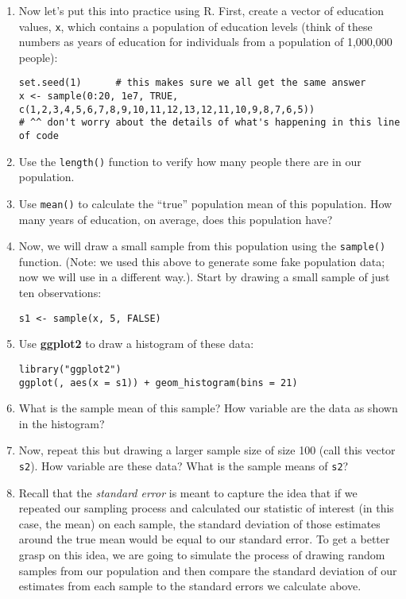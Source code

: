 \documentclass[a4paper,12pt]{article}
\begin{document}
\begin{enumerate}
\item Now let's put this into practice using R. First, create a vector of education values, \texttt{x}, which contains a population of education levels (think of these numbers as years of education for individuals from a population of 1,000,000 people):

\begin{verbatim}
set.seed(1)      # this makes sure we all get the same answer
x <- sample(0:20, 1e7, TRUE, c(1,2,3,4,5,6,7,8,9,10,11,12,13,12,11,10,9,8,7,6,5))
# ^^ don't worry about the details of what's happening in this line of code
\end{verbatim}

\item Use the \texttt{length()} function to verify how many people there are in our population.

\item Use \texttt{mean()} to calculate the ``true'' population mean of this population. How many years of education, on average, does this population have?

\item Now, we will draw a small sample from this population using the \texttt{sample()} function. (Note: we used this above to generate some fake population data; now we will use in a different way.). Start by drawing a small sample of just ten observations:

\begin{verbatim}
s1 <- sample(x, 5, FALSE)
\end{verbatim}

\item Use \textbf{ggplot2} to draw a histogram of these data:

\begin{verbatim}
library("ggplot2")
ggplot(, aes(x = s1)) + geom_histogram(bins = 21)
\end{verbatim}

\item What is the sample mean of this sample? How variable are the data as shown in the histogram?

\item Now, repeat this but drawing a larger sample size of size 100 (call this vector \texttt{s2}). How variable are these data? What is the sample means of \texttt{s2}?

\item Recall that the \textit{standard error} is meant to capture the idea that if we repeated our sampling process and calculated our statistic of interest (in this case, the mean) on each sample, the standard deviation of those estimates around the true mean would be equal to our standard error. To get a better grasp on this idea, we are going to simulate the process of drawing random samples from our population and then compare the standard deviation of our estimates from each sample to the standard errors we calculate above.


\end{enumerate}
\end{document}
